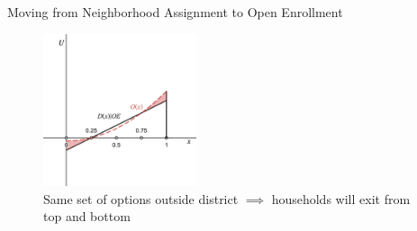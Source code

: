 \documentclass[notes,11pt, aspectratio=169]{beamer}
\begin{document}
\begin{frame}{Moving from Neighborhood Assignment to Open Enrollment}
\begin{figure}
\begin{overprint}
    \caption{Open enrollment equalizes school quality. Utility levels change}
    \centering\includegraphics[width=0.4\textwidth]{figures/school_choice.png}
    \caption{Same set of options outside district $\implies$ households will exit from top and bottom}
    \end{overprint}
\end{figure}
\end{frame}

\end{document}
